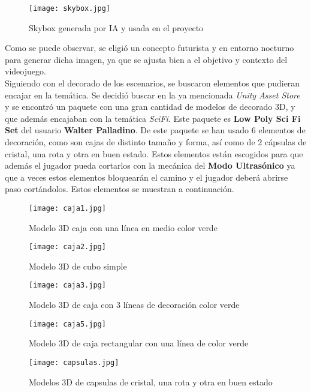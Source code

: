 \begin{figure}[H]
    \centering
    \texttt{[image: skybox.jpg]}
    \caption{Skybox generada por IA y usada en el proyecto}
\end{figure}

Como se puede observar, se eligió un concepto futurista y en entorno nocturno para generar dicha imagen, ya que se ajusta bien a el objetivo y contexto del videojuego.\\

Siguiendo con el decorado de los escenarios, se buscaron elementos que pudieran encajar en la temática. Se decidió buscar en la ya mencionada \textit{Unity Asset Store} y se encontró un paquete con una gran cantidad de modelos de decorado 3D, y que además encajaban con la temática \textit{SciFi}. Este paquete es \textbf{Low Poly Sci Fi Set} del usuario \textbf{Walter Palladino}. De este paquete se han usado 6 elementos de decoración, como son cajas de distinto tamaño y forma, así como de 2 cápsulas de cristal, una rota y otra en buen estado. Estos elementos están escogidos para que además el jugador pueda cortarlos con la mecánica del \textbf{Modo Ultrasónico} ya que a veces estos elementos bloquearán el camino y el jugador deberá abrirse paso cortándolos.
Estos elementos se muestran a continuación.

\begin{figure}[H]
    \centering
    \texttt{[image: caja1.jpg]}
    \caption{Modelo 3D caja con una línea en medio color verde}
\end{figure}

\begin{figure}[H]
    \centering
    \texttt{[image: caja2.jpg]}
    \caption{Modelo 3D de cubo simple}
\end{figure}

\begin{figure}[H]
    \centering
    \texttt{[image: caja3.jpg]}
    \caption{Modelo 3D de caja con 3 líneas de decoración color verde}
\end{figure}

\begin{figure}[H]
    \centering
    \texttt{[image: caja5.jpg]}
    \caption{Modelo 3D de caja rectangular con una línea de color verde}
\end{figure}

\begin{figure}[H]
    \centering
    \texttt{[image: capsulas.jpg]}
    \caption{Modelos 3D de capsulas de cristal, una rota y otra en buen estado}
\end{figure}

